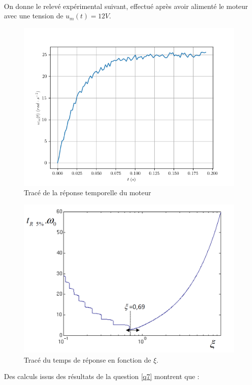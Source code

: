 ~\

On donne le relevé expérimental suivant, effectué après avoir alimenté le moteur avec une tension de $u_m(t)=12V$.

\begin{figure}[ht!]
\begin{center}
 \includegraphics[width=0.6\linewidth]{img/fig02}
\end{center}
\caption{\label{fig02} Tracé de la réponse temporelle du moteur}
\end{figure}



\newpage

\begin{figure}[!ht]
\begin{center}
 \includegraphics[width=0.6\linewidth]{img/fig03}
\end{center}
\caption{\label{fig03} Tracé du temps de réponse en fonction de $\xi$.}
\end{figure}

Des calculs issus des résultats de la question \ref{q7} montrent que : ~\

